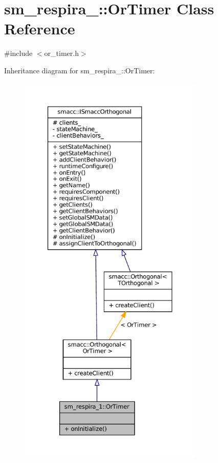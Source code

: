 \hypertarget{classsm__respira__1_1_1OrTimer}{}\section{sm\+\_\+respira\+\_\+:\+:Or\+Timer Class Reference}
\label{classsm__respira__1_1_1OrTimer}


{\ttfamily \#include $<$or\+\_\+timer.\+h$>$}



Inheritance diagram for sm\+\_\+respira\+\_\+:\+:Or\+Timer\+:
\nopagebreak
\begin{figure}[H]
\begin{center}
\leavevmode
\includegraphics[height=550pt]{classsm__respira__1_1_1OrTimer__inherit__graph}
\end{center}
\end{figure}


